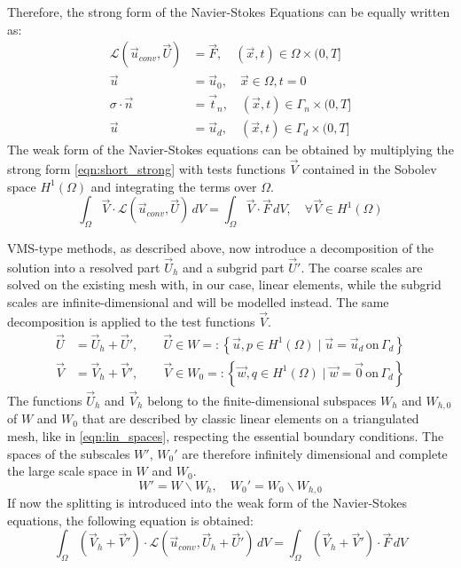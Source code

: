 Therefore, the strong form of the Navier-Stokes Equations can be equally written as:
\begin{equation}
	\begin{split}
		\mathcal{L}(\vec{u}_{conv}, \vec{U}) &= \vec{F}, \quad (\vec{x}, t) \in \Omega \times (0,T]\\
		\vec{u} &= \vec{u}_0, \quad \vec{x} \in \Omega, t=0\\
		\sigma \cdot \vec{n} &= \vec{t}_{n}, \quad (\vec{x}, t) \in \Gamma_{n} \times (0,T]\\
		\vec{u} &= \vec{u}_d, \quad (\vec{x}, t) \in \Gamma_{d} \times (0,T]
	\end{split}
	\label{eqn:short_strong}
\end{equation}
The weak form of the Navier-Stokes equations can be obtained by multiplying the strong form \autoref{eqn:short_strong} with tests functions $\vec{V}$ contained in the Sobolev space $H^1(\Omega)$ and integrating the terms over $\Omega$.
\begin{equation*}
	\int_{\Omega} \vec{V} \cdot \mathcal{L}(\vec{u}_{conv}, \vec{U}) \,dV = \int_{\Omega} \vec{V} \cdot \vec{F} \,dV, \quad \forall \vec{V} \in H^1(\Omega)
\end{equation*}

VMS-type methods, as described above, now introduce a decomposition of the solution into a resolved part $\vec{U}_h$ and a subgrid part $\vec{U}'$. The coarse scales are solved on the existing mesh with, in our case, linear elements, while the subgrid scales are infinite-dimensional and will be modelled instead. The same decomposition is applied to the test functions $\vec{V}$.
\begin{equation*}
	\begin{split}
		\vec{U} &= \vec{U}_h + \vec{U}', \qquad \vec{U} \in W =: \left\{ \vec{u}, p \in H^1(\Omega) \mid \vec{u} = \vec{u}_d\,\text{on}\,\Gamma_{d} \right\}\\
		\vec{V} &= \vec{V}_h + \vec{V}', \qquad \vec{V} \in W_0 =: \left\{ \vec{w}, q \in H^1(\Omega) \mid \vec{w} = \vec{0}\,\text{on}\,\Gamma_{d} \right\}
	\end{split}
\end{equation*}
The functions $\vec{U}_h$ and $\vec{V}_h$ belong to the finite-dimensional subspaces $W_h$ and $W_{h,0}$ of $W$ and $W_0$ that are described by classic linear elements on a triangulated mesh, like in \autoref{eqn:lin_spaces}, respecting the essential boundary conditions. The spaces of the subscales $W'$, $W_0'$ are therefore infinitely dimensional and complete the large scale space in $W$ and $W_0$.
\begin{equation*}
	W' = {W} \backslash {W_h}, \quad W_0' = W_0 \backslash {W}_{h,0}
\end{equation*}
If now the splitting is introduced into the weak form of the Navier-Stokes equations, the following equation is obtained:
\begin{equation*}
	\int_{\Omega} (\vec{V}_h+\vec{V}') \cdot \mathcal{L}(\vec{u}_{conv}, \vec{U}_h + \vec{U}') \,dV = \int_{\Omega} (\vec{V}_h+\vec{V}') \cdot \vec{F} \,dV
\end{equation*}

